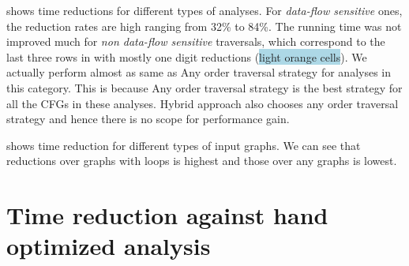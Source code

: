  shows time reductions for 
different types of analyses. For \textit{data-flow sensitive} ones, the 
reduction rates are high ranging from 32\% to 84\%. 
The running time was not improved much for \emph{non data-flow sensitive} 
traversals, which correspond to the last three rows in  
with mostly one digit reductions (\colorbox{lightblue}{light orange 
cells}). 
We actually perform almost as same as Any order traversal 
strategy for analyses in this category. This is because Any order traversal 
strategy is the best strategy for all the CFGs in these analyses. Hybrid 
approach also chooses any order traversal strategy and hence there is no 
scope for performance gain. 

 shows time reduction for
different \graphprop{} types of input graphs. We can see that
reductions over graphs with loops is highest and those over any graphs
is lowest.

\section{Time reduction against hand optimized analysis}
\label{sec:hand-optimized}


